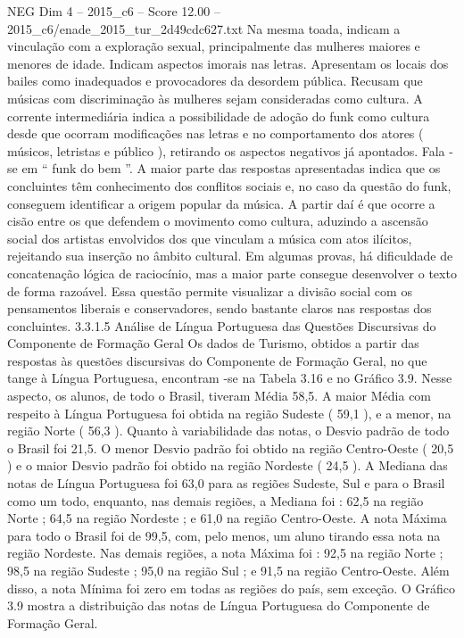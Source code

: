 \begin{textsample}{NEG Dim 4 – 2015\_c6 – Score 12.00 – 2015\_c6/enade\_2015\_tur\_2d49cdc627.txt}
Na mesma toada, indicam a vinculação com a exploração sexual, principalmente das mulheres maiores e menores de idade.
Indicam aspectos imorais nas letras.
Apresentam os locais dos bailes como inadequados e provocadores da desordem pública.
Recusam que músicas com discriminação às mulheres sejam consideradas como cultura.
A corrente intermediária indica a possibilidade de adoção do funk como cultura desde que ocorram modificações nas letras e no comportamento dos atores ( músicos, letristas e público ), retirando os aspectos negativos já apontados.
Fala -se em “ funk do bem ”.
A maior parte das respostas apresentadas indica que os concluintes têm conhecimento dos conflitos sociais e, no caso da questão do funk, conseguem identificar a origem popular da música.
A partir daí é que ocorre a cisão entre os que defendem o movimento como cultura, aduzindo a ascensão social dos artistas envolvidos dos que vinculam a música com atos ilícitos, rejeitando sua inserção no âmbito cultural.
Em algumas provas, há dificuldade de concatenação lógica de raciocínio, mas a maior parte consegue desenvolver o texto de forma razoável.
Essa questão permite visualizar a divisão social com os pensamentos liberais e conservadores, sendo bastante claros nas respostas dos concluintes. 3.3.1.5 Análise de Língua Portuguesa das Questões Discursivas do Componente de Formação Geral Os dados de Turismo, obtidos a partir das respostas às questões discursivas do Componente de Formação Geral, no que tange à Língua Portuguesa, encontram -se na Tabela 3.16 e no Gráfico 3.9.
Nesse aspecto, os alunos, de todo o Brasil, tiveram Média 58,5.
A maior Média com respeito à Língua Portuguesa foi obtida na região Sudeste ( 59,1 ), e a menor, na região Norte ( 56,3 ).
Quanto à variabilidade das notas, o Desvio padrão de todo o Brasil foi 21,5.
O menor Desvio padrão foi obtido na região Centro-Oeste ( 20,5 ) e o maior Desvio padrão foi obtido na região Nordeste ( 24,5 ).
A Mediana das notas de Língua Portuguesa foi 63,0 para as regiões Sudeste, Sul e para o Brasil como um todo, enquanto, nas demais regiões, a Mediana foi : 62,5 na região Norte ; 64,5 na região Nordeste ; e 61,0 na região Centro-Oeste.
A nota Máxima para todo o Brasil foi de 99,5, com, pelo menos, um aluno tirando essa nota na região Nordeste.
Nas demais regiões, a nota Máxima foi : 92,5 na região Norte ; 98,5 na região Sudeste ; 95,0 na região Sul ; e 91,5 na região Centro-Oeste.
Além disso, a nota Mínima foi zero em todas as regiões do país, sem exceção.
O Gráfico 3.9 mostra a distribuição das notas de Língua Portuguesa do Componente de Formação Geral.

\end{textsample}
